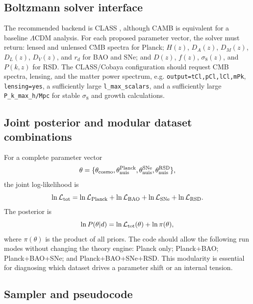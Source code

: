 \documentclass[pdflatex,sn-mathphys-num]{sn-jnl}%
\begin{document}
\subsection{Boltzmann solver interface}
\label{subsec:pipeline_boltzmann}

The recommended backend is CLASS \cite{Blas:2011rf}, although CAMB \cite{Lewis:1999bs} is equivalent for a baseline
$\Lambda$CDM analysis. For each proposed parameter vector, the solver must
return: lensed and unlensed CMB spectra for Planck; $H(z)$, $D_A(z)$,
$D_M(z)$, $D_L(z)$, $D_V(z)$, and $r_d$ for BAO and SNe; and $D(z)$,
$f(z)$, $\sigma_8(z)$, and $P(k,z)$ for RSD. The CLASS/Cobaya configuration
should request CMB spectra, lensing, and the matter power spectrum, e.g.
\texttt{output=tCl,pCl,lCl,mPk}, \texttt{lensing=yes}, a sufficiently large
\texttt{l\_max\_scalars}, and a sufficiently large \texttt{P\_k\_max\_h/Mpc}
for stable $\sigma_8$ and growth calculations.

\subsection{Joint posterior and modular dataset combinations}
\label{subsec:pipeline_posterior}

For a complete parameter vector
\begin{equation}
\theta=\{\theta_{\rm cosmo},\theta_{\rm nuis}^{\rm Planck},\theta_{\rm nuis}^{\rm SNe},\theta_{\rm nuis}^{\rm RSD}\},
\end{equation}
the joint log-likelihood is
\begin{equation}
\ln {\cal L}_{\rm tot}=\ln {\cal L}_{\rm Planck}+\ln {\cal L}_{\rm BAO}
+\ln {\cal L}_{\rm SNe}+\ln {\cal L}_{\rm RSD}.
\end{equation}
The posterior is
\begin{equation}
\ln P(\theta|d)=\ln {\cal L}_{\rm tot}(\theta)+\ln \pi(\theta),
\end{equation}
where $\pi(\theta)$ is the product of all priors. The code should allow the
following run modes without changing the theory engine: Planck only;
Planck+BAO; Planck+BAO+SNe; and Planck+BAO+SNe+RSD. This modularity is
essential for diagnosing which dataset drives a parameter shift or an internal
tension.

\subsection{Sampler and pseudocode}
\label{subsec:pipeline_sampler}
\end{document}
